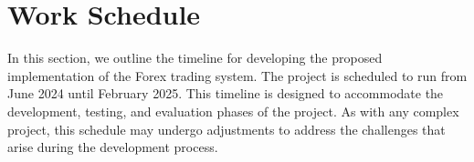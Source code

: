 \section{Work Schedule}

In this section, we outline the timeline for developing the proposed implementation of the Forex trading system. The project is scheduled to run from June 2024 until February 2025. This timeline is designed to accommodate the development, testing, and evaluation phases of the project. As with any complex project, this schedule may undergo adjustments to address the challenges that arise during the development process.

